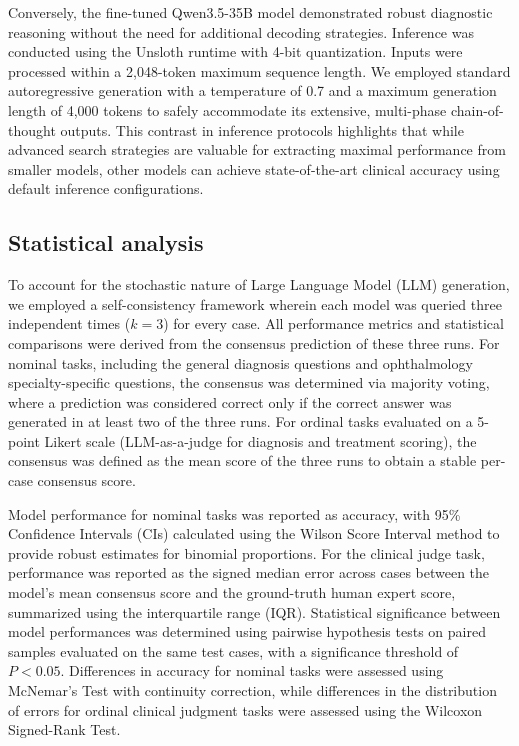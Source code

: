 \documentclass[10pt,journal,compsoc, onecolumn]{IEEEtran}
\begin{document}
Conversely, the fine-tuned Qwen3.5-35B model demonstrated robust diagnostic reasoning without the need for additional decoding strategies. Inference was conducted using the Unsloth runtime with 4-bit quantization. Inputs were processed within a 2,048-token maximum sequence length. We employed standard autoregressive generation with a temperature of 0.7 and a maximum generation length of 4,000 tokens to safely accommodate its extensive, multi-phase chain-of-thought outputs. This contrast in inference protocols highlights that while advanced search strategies are valuable for extracting maximal performance from smaller models, other models can achieve state-of-the-art clinical accuracy using default inference configurations.




\subsection*{Statistical analysis}
To account for the stochastic nature of Large Language Model (LLM) generation, we employed a self-consistency framework wherein each model was queried three independent times ($k=3$) for every case. All performance metrics and statistical comparisons were derived from the consensus prediction of these three runs. For nominal tasks, including the general diagnosis questions and ophthalmology specialty-specific questions, the consensus was determined via majority voting, where a prediction was considered correct only if the correct answer was generated in at least two of the three runs. For ordinal tasks evaluated on a 5-point Likert scale (LLM-as-a-judge for diagnosis and treatment scoring), the consensus was defined as the mean score of the three runs to obtain a stable per-case consensus score.

Model performance for nominal tasks was reported as accuracy, with 95\% Confidence Intervals (CIs) calculated using the Wilson Score Interval method to provide robust estimates for binomial proportions. For the clinical judge task, performance was reported as the signed median error across cases between the model’s mean consensus score and the ground-truth human expert score, summarized using the interquartile range (IQR). Statistical significance between model performances was determined using pairwise hypothesis tests on paired samples evaluated on the same test cases, with a significance threshold of $P < 0.05$. Differences in accuracy for nominal tasks were assessed using McNemar’s Test with continuity correction, while differences in the distribution of errors for ordinal clinical judgment tasks were assessed using the Wilcoxon Signed-Rank Test.
\end{document}
